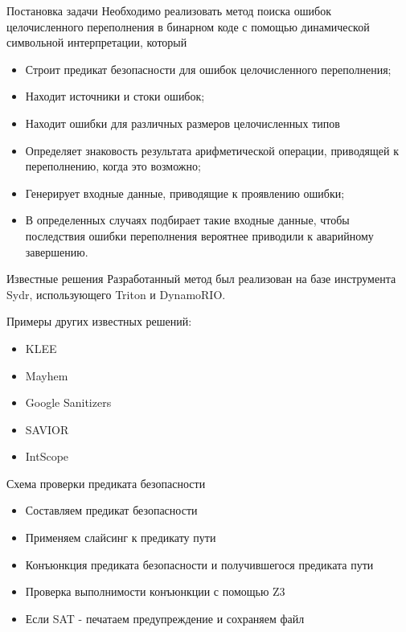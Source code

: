 \documentclass[10pt]{beamer}
\begin{document}
\begin{frame}{Постановка задачи}
Необходимо реализовать метод поиска ошибок целочисленного переполнения в
бинарном коде с помощью динамической символьной интерпретации, который
\begin{itemize}
    \item Строит предикат безопасности для ошибок целочисленного переполнения;
    \item Находит источники и стоки ошибок;
    \item Находит ошибки для различных размеров целочисленных типов
    \item Определяет знаковость результата арифметической операции, приводящей к
        переполнению, когда это возможно;
    \item Генерирует входные данные, приводящие к проявлению ошибки;
    \item В определенных случаях подбирает такие входные данные, чтобы
        последствия ошибки переполнения вероятнее приводили к аварийному
        завершению.
\end{itemize}
\end{frame}

\begin{frame}{Известные решения}
Разработанный метод был реализован на базе инструмента Sydr, использующего
Triton и DynamoRIO.

Примеры других известных решений:
\begin{itemize}
    \item KLEE
    \item Mayhem
    \item Google Sanitizers
    \item SAVIOR
    \item IntScope
\end{itemize}
\end{frame}

\begin{frame}{Схема проверки предиката безопасности}
\begin{itemize}
    \item Составляем предикат безопасности
    \item Применяем слайсинг к предикату пути
    \item Конъюнкция предиката безопасности и получившегося предиката пути
    \item Проверка выполнимости конъюнкции с помощью Z3
    \item Если SAT - печатаем предупреждение и сохраняем файл
\end{itemize}
\end{frame}
\end{document}
